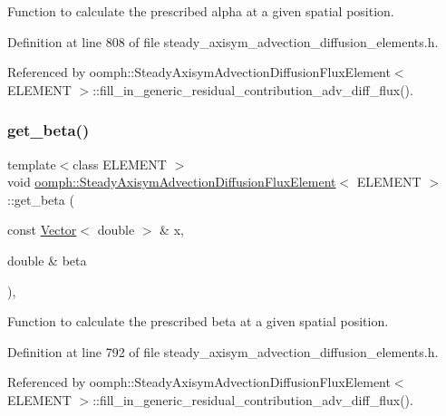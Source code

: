 Function to calculate the prescribed alpha at a given spatial position. 



Definition at line 808 of file steady\+\_\+axisym\+\_\+advection\+\_\+diffusion\+\_\+elements.\+h.



Referenced by oomph\+::\+Steady\+Axisym\+Advection\+Diffusion\+Flux\+Element$<$ E\+L\+E\+M\+E\+N\+T $>$\+::fill\+\_\+in\+\_\+generic\+\_\+residual\+\_\+contribution\+\_\+adv\+\_\+diff\+\_\+flux().

\mbox{\label{classoomph_1_1SteadyAxisymAdvectionDiffusionFluxElement_a0b80bac76c3b25e1f37b199748c2c82c}} 
\subsubsection{\texorpdfstring{get\+\_\+beta()}{get\_beta()}}
{\footnotesize\ttfamily template$<$class E\+L\+E\+M\+E\+NT $>$ \\
void \hyperlink{classoomph_1_1SteadyAxisymAdvectionDiffusionFluxElement}{oomph\+::\+Steady\+Axisym\+Advection\+Diffusion\+Flux\+Element}$<$ E\+L\+E\+M\+E\+NT $>$\+::get\+\_\+beta (\begin{DoxyParamCaption}\item[{const \hyperlink{classoomph_1_1Vector}{Vector}$<$ double $>$ \&}]{x,  }\item[{double \&}]{beta }\end{DoxyParamCaption})\hspace{0.3cm}{\ttfamily [inline]}, {\ttfamily [protected]}}



Function to calculate the prescribed beta at a given spatial position. 



Definition at line 792 of file steady\+\_\+axisym\+\_\+advection\+\_\+diffusion\+\_\+elements.\+h.



Referenced by oomph\+::\+Steady\+Axisym\+Advection\+Diffusion\+Flux\+Element$<$ E\+L\+E\+M\+E\+N\+T $>$\+::fill\+\_\+in\+\_\+generic\+\_\+residual\+\_\+contribution\+\_\+adv\+\_\+diff\+\_\+flux().

